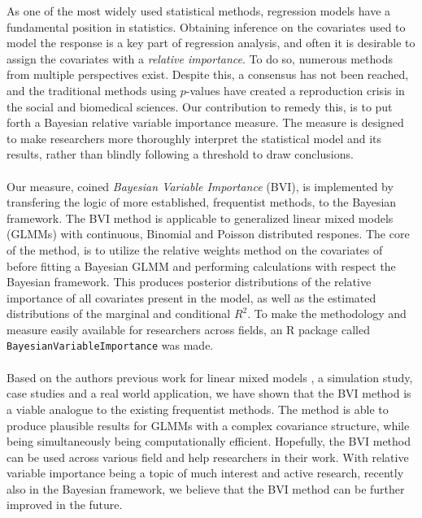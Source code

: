 As one of the most widely used statistical methods, regression models have a fundamental position in statistics. Obtaining inference on the covariates used to model the response is a key part of regression analysis, and often it is desirable to assign the covariates with a \textit{relative importance}. To do so, numerous methods from multiple perspectives exist. Despite this, a consensus has not been reached, and the traditional methods using $p$-values have created a reproduction crisis in the social and biomedical sciences. Our contribution to remedy this, is to put forth a Bayesian relative variable importance measure. The measure is designed to make researchers more thoroughly interpret the statistical model and its results, rather than blindly following a threshold to draw conclusions.
\\
\\
Our measure, coined \textit{Bayesian Variable Importance} (BVI), is implemented by transfering the logic of more established, frequentist methods, to the Bayesian framework. The BVI method is applicable to generalized linear mixed models (GLMMs) with continuous, Binomial and Poisson distributed respones. The core of the method, is to utilize the relative weights method on the covariates of before fitting a Bayesian GLMM and performing calculations with respect the Bayesian framework. This produces posterior distributions of the relative importance of all covariates present in the model, as well as the estimated distributions of the marginal and conditional $R^2$. To make the methodology and measure easily available for researchers across fields, an R package called \texttt{BayesianVariableImportance} was made.
\\
\\
Based on the authors previous work for linear mixed models \citep{Arnstad:Relative_variable_importance_in_Bayesian_linear_mixed_models:2024}, a simulation study, case studies and a real world application, we have shown that the BVI method is a viable analogue to the existing frequentist methods. The method is able to produce plausible results for GLMMs with a complex covariance structure, while being simultaneously being computationally efficient. Hopefully, the BVI method can be used across various field and help researchers in their work. With relative variable importance being a topic of much interest and active research, recently also in the Bayesian framework, we believe that the BVI method can be further improved in the future.